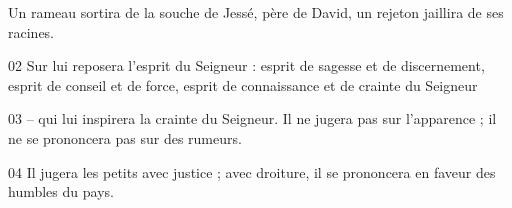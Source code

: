 Un rameau sortira de la souche de Jessé, père de David, un rejeton jaillira de ses racines.

02 Sur lui reposera l’esprit du Seigneur : esprit de sagesse et de discernement, esprit de conseil et de force, esprit de connaissance et de crainte du Seigneur

03 – qui lui inspirera la crainte du Seigneur. Il ne jugera pas sur l’apparence ; il ne se prononcera pas sur des rumeurs.

04 Il jugera les petits avec justice ; avec droiture, il se prononcera en faveur des humbles du pays. 